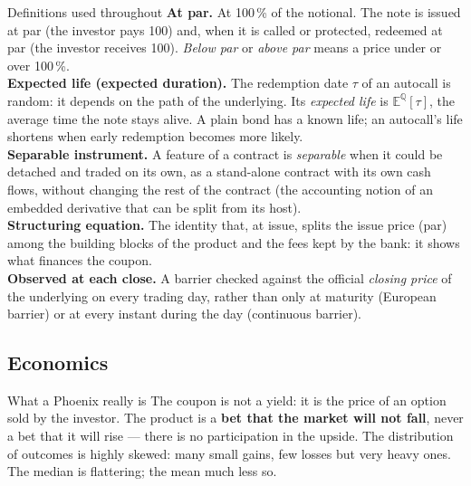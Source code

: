 \documentclass[11pt,a4paper]{article}
\newcommand{\E}{\mathbb{E}^{\mathbb{Q}}}
\begin{document}
\begin{greybox}{Definitions used throughout}
\small
\textbf{At par.} At 100\,\% of the notional. The note is issued at par (the investor pays 100) and, when it is called
or protected, redeemed at par (the investor receives 100). \emph{Below par} or \emph{above par} means a price under or
over 100\,\%.\\
\textbf{Expected life (expected duration).} The redemption date $\tau$ of an autocall is random: it depends on the
path of the underlying. Its \emph{expected life} is $\E[\tau]$, the average time the note stays alive. A plain bond has a
known life; an autocall's life shortens when early redemption becomes more likely.\\
\textbf{Separable instrument.} A feature of a contract is \emph{separable} when it could be detached and traded on
its own, as a stand-alone contract with its own cash flows, without changing the rest of the contract (the
accounting notion of an embedded derivative that can be split from its host).\\
\textbf{Structuring equation.} The identity that, at issue, splits the issue price (par) among the building blocks
of the product and the fees kept by the bank: it shows what finances the coupon.\\
\textbf{Observed at each close.} A barrier checked against the official \emph{closing price} of the underlying on every
trading day, rather than only at maturity (European barrier) or at every instant during the day (continuous
barrier).
\end{greybox}

\subsection{Economics}

\begin{greybox}{What a Phoenix really is}
The coupon is not a yield: it is the price of an option sold by the investor. The product is a
\textbf{bet that the market will not fall}, never a bet that it will rise --- there is no participation in
the upside. The distribution of outcomes is highly skewed: many small gains, few losses but very
heavy ones. The median is flattering; the mean much less so.
\end{greybox}
\end{document}
